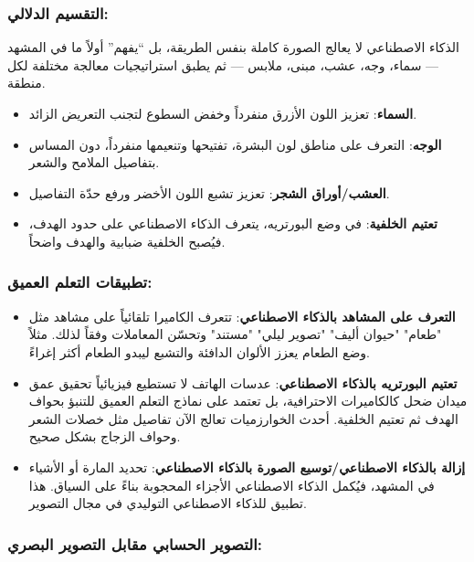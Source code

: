 \subsubsection*{التقسيم الدلالي:}

الذكاء الاصطناعي لا يعالج الصورة كاملة بنفس الطريقة، بل “يفهم” أولاً ما في المشهد — سماء، وجه، عشب، مبنى، ملابس — ثم يطبق استراتيجيات معالجة مختلفة لكل منطقة.

\begin{itemize}
  \item \textbf{السماء}: تعزيز اللون الأزرق منفرداً وخفض السطوع لتجنب التعريض الزائد.
  \item \textbf{الوجه}: التعرف على مناطق لون البشرة، تفتيحها وتنعيمها منفرداً، دون المساس بتفاصيل الملامح والشعر.
  \item \textbf{العشب/أوراق الشجر}: تعزيز تشبع اللون الأخضر ورفع حدّة التفاصيل.
  \item \textbf{تعتيم الخلفية}: في وضع البورتريه، يتعرف الذكاء الاصطناعي على حدود الهدف، فيُصبح الخلفية ضبابية والهدف واضحاً.
\end{itemize}

\subsubsection*{تطبيقات التعلم العميق:}

\begin{itemize}
  \item \textbf{التعرف على المشاهد بالذكاء الاصطناعي}: تتعرف الكاميرا تلقائياً على مشاهد مثل "طعام" "حيوان أليف" "تصوير ليلي" "مستند" وتحسّن المعاملات وفقاً لذلك. مثلاً وضع الطعام يعزز الألوان الدافئة والتشبع ليبدو الطعام أكثر إغراءً.
  \item \textbf{تعتيم البورتريه بالذكاء الاصطناعي}: عدسات الهاتف لا تستطيع فيزيائياً تحقيق عمق ميدان ضحل كالكاميرات الاحترافية، بل تعتمد على نماذج التعلم العميق للتنبؤ بحواف الهدف ثم تعتيم الخلفية. أحدث الخوارزميات تعالج الآن تفاصيل مثل خصلات الشعر وحواف الزجاج بشكل صحيح.
  \item \textbf{إزالة بالذكاء الاصطناعي/توسيع الصورة بالذكاء الاصطناعي}: تحديد المارة أو الأشياء في المشهد، فيُكمل الذكاء الاصطناعي الأجزاء المحجوبة بناءً على السياق. هذا تطبيق للذكاء الاصطناعي التوليدي في مجال التصوير.
\end{itemize}

\subsubsection*{التصوير الحسابي مقابل التصوير البصري:}


